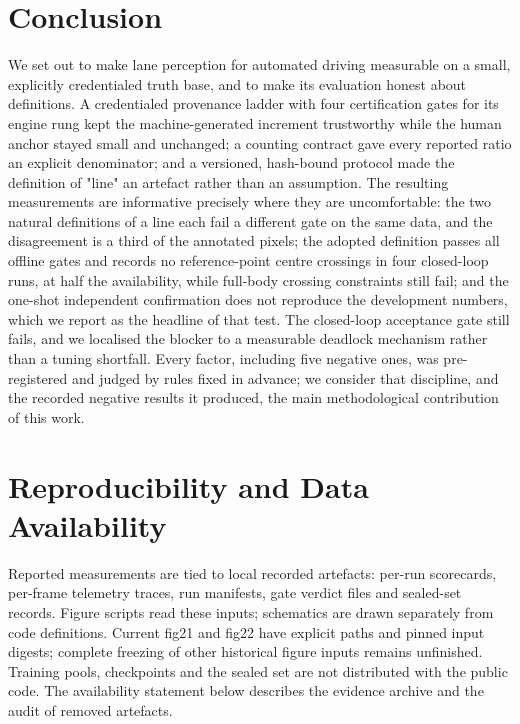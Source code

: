 \documentclass[journal]{IEEEtran}
\begin{document}
\section{Conclusion}
We set out to make lane perception for automated driving measurable on a small, explicitly credentialed truth base,
and to make its evaluation honest about definitions. A credentialed provenance ladder with four certification gates for its engine rung kept the machine-generated increment
trustworthy while the human anchor stayed small and unchanged; a counting contract gave every reported ratio an
explicit denominator; and a versioned, hash-bound protocol made the definition of "line" an artefact
rather than an assumption. The resulting measurements are informative precisely where they are
uncomfortable: the two natural definitions of a line each fail a different gate on the same data, and
the disagreement is a third of the annotated pixels; the adopted definition passes all offline gates
and records no reference-point centre crossings in four closed-loop runs, at half the availability,
while full-body crossing constraints still fail; and the one-shot
independent confirmation does not reproduce the development numbers, which we report as the headline
of that test. The closed-loop acceptance gate still fails, and we localised the blocker to a
measurable deadlock mechanism rather than a tuning shortfall. Every factor, including five negative
ones, was pre-registered and judged by rules fixed in advance; we consider that discipline, and the
recorded negative results it produced, the main methodological contribution of this work.
\section*{Reproducibility and Data Availability}
Reported measurements are tied to local recorded artefacts: per-run scorecards, per-frame telemetry
traces, run manifests, gate verdict files and sealed-set records. Figure scripts read these inputs;
schematics are drawn separately from code definitions. Current fig21 and fig22 have explicit paths
and pinned input digests; complete freezing of other historical figure inputs remains unfinished.
Training pools, checkpoints and the sealed set are not distributed with the public code. The
availability statement below describes the evidence archive and the audit of removed artefacts.
\end{document}

